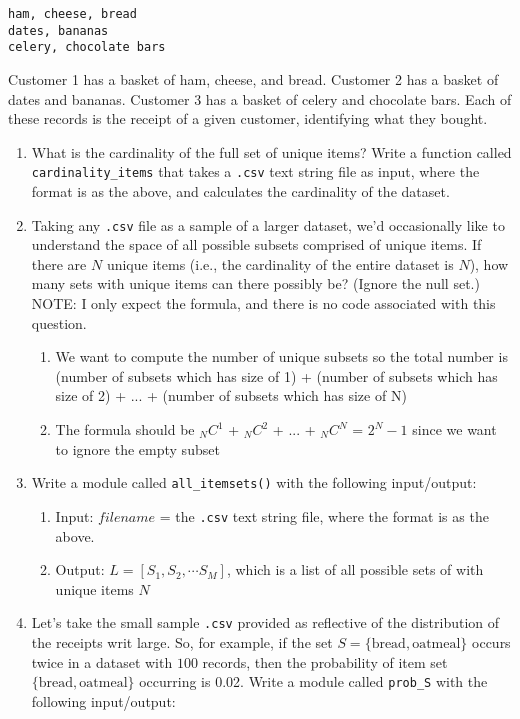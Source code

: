 \documentclass[paper=a4, fontsize=11pt]{scrartcl} %
\begin{document}
\begin{lstlisting}
ham, cheese, bread
dates, bananas
celery, chocolate bars
\end{lstlisting}

Customer 1 has a basket of ham, cheese, and bread. Customer 2 has a basket of dates and bananas. Customer 3 has a basket of celery and chocolate bars. Each of these records is the receipt of a given customer, identifying what they bought.

\begin{enumerate}
    \item What is the cardinality of the full set of unique items? Write a function called \verb"cardinality_items" that takes a \verb".csv" text string file as input, where the format is as the above, and calculates the cardinality of the dataset.
    \item Taking any \verb".csv" file as a sample of a larger dataset, we'd occasionally like to understand the space of all possible subsets comprised of unique items. If there are $N$ unique items (i.e., the cardinality of the entire dataset is $N$), how many sets with unique items can there possibly be? (Ignore the null set.) NOTE: I only expect the formula, and there is no code associated with this question.
        \begin{enumerate}
            \item We want to compute the number of unique subsets so the total number is (number of subsets which has size of 1) + (number of subsets which has size of 2) + ... + (number of subsets which has size of N)
            \item The formula should be $_{N}C^{1}$ + $_{N}C^{2}$ + ... + $_{N}C^{N}$ = $2^{N} - 1$ since we want to ignore the empty subset
        \end{enumerate}
    \item Write a module called \verb"all_itemsets()" with the following input/output:
      \begin{enumerate}
      \item Input: $filename$ = the \verb".csv" text string file, where the format is as the above.
      \item Output: $L = [ S_1, S_2, \cdots S_M ]$, which is a list of all possible sets of with unique items $N$
      \end{enumerate}
    \item Let's take the small sample \verb".csv" provided as reflective of the distribution of the receipts writ large. So, for example, if the set $S= \{ \text{bread}, \text{oatmeal}\}$ occurs twice in a dataset with $100$ records, then the probability of item set $\{ \text{bread}, \text{oatmeal} \}$ occurring is 0.02. Write a module called \verb"prob_S" with the following input/output:

\end{enumerate}
\end{document}
